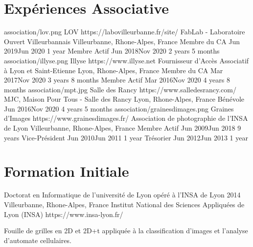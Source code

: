 \documentclass[
  paper=a4,
  fontsize=10pt
]{resume}
\begin{document}
{{{{  \section[\fa{hands-helping}]{Expériences Associative}%
    \vspace{-1em}
      \volunteerorganization
        {association/lov.png}
        {LOV}
        {https://labovilleurbanne.fr/site/}
        {FabLab - Laboratoire Ouvert Villeurbannais}
        {Villeurbanne, Rhone-Alpes, France}
        {
        \volunteerposition
          {Membre du CA}
          {Jun 2019\textendash Jun 2020}
          {1 year}
          {}
        \volunteerposition
          {Membre Actif}
          {Jun 2018\textendash Nov 2020}
          {2 years 5 months}
          {}
        }
      \volunteerorganization
        {association/illyse.png}
        {Illyse}
        {https://www.illyse.net}
        {Fournisseur d'Accès Associatif à Lyon et Saint-Etienne}
        {Lyon, Rhone-Alpes, France}
        {
        \volunteerposition
          {Membre du CA}
          {Mar 2017\textendash Nov 2020}
          {3 years 8 months}
          {}
        \volunteerposition
          {Membre Actif}
          {Mar 2016\textendash Nov 2020}
          {4 years 8 months}
          {}
        }
      \volunteerorganization
        {association/mpt.jpg}
        {Salle des Rancy}
        {https://www.salledesrancy.com/}
        {MJC, Maison Pour Tous - Salle des Rancy}
        {Lyon, Rhone-Alpes, France}
        {
        \volunteerposition
          {Bénévole}
          {Jun 2016\textendash Nov 2020}
          {4 years 5 months}
          {}
        }
      \volunteerorganization
        {association/grainesdimages.png}
        {Graines d'Images}
        {https://www.grainesdimages.fr/}
        {Association de photographie de l'INSA de Lyon}
        {Villeurbanne, Rhone-Alpes, France}
        {
        \volunteerposition
          {Membre Actif}
          {Jun 2009\textendash Jun 2018}
          {9 years}
          {}
        \volunteerposition
          {Vice-Président}
          {Jun 2010\textendash Jun 2011}
          {1 year}
          {}
        \volunteerposition
          {Trésorier}
          {Jun 2012\textendash Jun 2013}
          {1 year}
          {}
        }
  \section[\fa{graduation-cap}]{Formation Initiale}
    \schooldiploma
      {Doctorat en Informatique de l'université de Lyon opéré à l'INSA de Lyon}
      {2014}
      {Villeurbanne, Rhone-Alpes, France}
      {Institut National des Sciences Appliquées de Lyon (INSA)}
      {https://www.insa-lyon.fr/}
      {
        Fouille de grilles en 2D et 2D+t appliquée à la classification d'images et l'analyse d'automate cellulaires.

}}}}}
\end{document}
